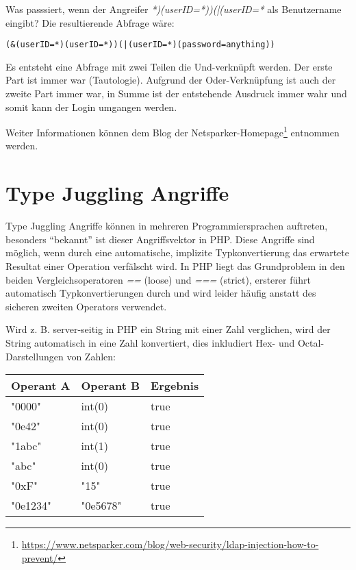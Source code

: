 Was passsiert, wenn der Angreifer \textit{*)(userID=*))(|(userID=*} als Benutzername eingibt? Die resultierende Abfrage wäre:

\begin{verbatim}
(&(userID=*)(userID=*))(|(userID=*)(password=anything))
\end{verbatim}

Es entsteht eine Abfrage mit zwei Teilen die Und-verknüpft werden. Der erste Part ist immer war (Tautologie). Aufgrund der Oder-Verknüpfung ist auch der zweite Part immer war, in Summe ist der entstehende Ausdruck immer wahr und somit kann der Login umgangen werden.

Weiter Informationen können dem Blog der Netsparker-Homepage\footnote{\url{https://www.netsparker.com/blog/web-security/ldap-injection-how-to-prevent/}} entnommen werden.

\section{Type Juggling Angriffe}

Type Juggling Angriffe können in mehreren Programmiersprachen auftreten, besonders ``bekannt'' ist dieser Angriffsvektor in PHP. Diese Angriffe sind möglich, wenn durch eine automatische, implizite Typkonvertierung das erwartete Resultat einer Operation verfälscht wird. In PHP liegt das Grundproblem in den beiden Vergleichsoperatoren \textit{==} (loose) und \textit{===} (strict), ersterer führt automatisch Typkonvertierungen durch und wird leider häufig anstatt des sicheren zweiten Operators verwendet.

Wird z. B. server-seitig in PHP ein String mit einer Zahl verglichen, wird der String automatisch in eine Zahl konvertiert, dies inkludiert Hex- und Octal-Darstellungen von Zahlen:

\begin{tabularx}{\textwidth}{|X|X|X|}
	\hline
	Operant A & Operant B & Ergebnis \\
	\hline
	"0000" & int(0) & true \\
	"0e42" & int(0) & true \\
	"1abc" & int(1) & true \\
	"abc"  & int(0) & true \\
	"0xF"  & "15"   & true \\
	"0e1234" & "0e5678" & true \\
	\hline
\end{tabularx}


